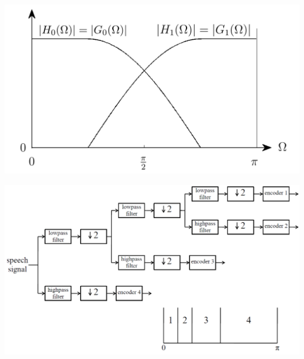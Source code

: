 \begin{center}
	\includegraphics[scale=.7]{./images/power_symetric}
\end{center}
\begin{center}
	\includegraphics[scale=.7]{./images/quadrature_mirror_ex}
\end{center}

